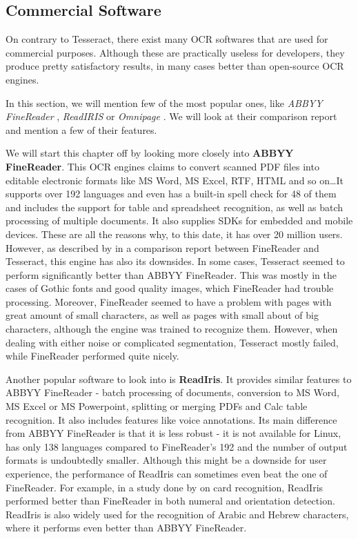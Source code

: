 \subsection{Commercial Software}

On contrary to Tesseract, there exist many OCR softwares that are used for commercial purposes. Although these are practically useless for developers, they produce pretty satisfactory results, in many cases better than open-source OCR engines.

In this section, we will mention few of the most popular ones, like \emph{ABBYY FineReader} \citep{Finereader}, \emph{ReadIRIS} \citep{ReadIris} or \emph{Omnipage} \citep{Omnipage}. We will look at their comparison report and mention a few of their features.

We will start this chapter off by looking more closely into \textbf{ABBYY FineReader}. This OCR engines claims to convert scanned PDF files into editable electronic formats like MS Word, MS Excel, RTF, HTML and so on\ldots It supports over 192 languages and even has a built-in spell check for 48 of them and includes the support for table and spreadsheet recognition, as well as batch processing of multiple documents. It also supplies SDKs for embedded and mobile devices. These are all the reasons why, to this date, it has over 20 million users. However, as described by \citet{comparisonTessABBYY} in a comparison report between FineReader and Tesseract, this engine has also its downsides. In some cases, Tesseract seemed to perform significantly better than ABBYY FineReader. This was mostly in the cases of Gothic fonts and good quality images, which FineReader had trouble processing. Moreover, FineReader seemed to have a problem with pages with great amount of small characters, as well as pages with small about of big characters, although the engine was trained to recognize them. However, when dealing with either noise or complicated segmentation, Tesseract mostly failed, while FineReader performed quite nicely.

Another popular software to look into is \textbf{ReadIris}. It provides similar features to ABBYY FineReader - batch processing of documents, conversion to MS Word, MS Excel or MS Powerpoint, splitting or merging PDFs and Calc table recognition. It also includes features like voice annotations. Its main difference from ABBYY FineReader is that it is less robust - it is not available for Linux, has only 138 languages compared to FineReader's 192 and the number of output formats is undoubtedly smaller. Although this might be a downside for user experience, the performance of ReadIris can sometimes even beat the one of FineReader. For example, in a study done by \citet{compABBYYIris} on card recognition, ReadIris performed better than FineReader in both numeral and orientation detection. ReadIris is also widely used for the recognition of Arabic and Hebrew characters, where it performs even better than ABBYY FineReader.

